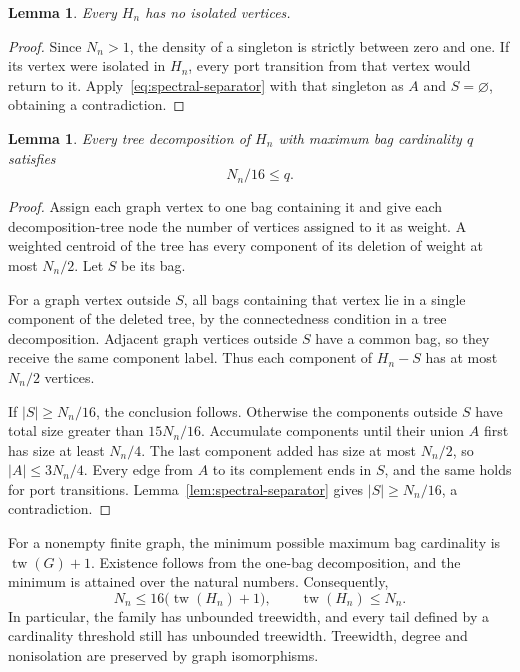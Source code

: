 \documentclass[11pt,reqno]{amsart}
\numberwithin{equation}{section}
\newtheorem{lemma}[theorem]{Lemma}
\theoremstyle{definition}
\theoremstyle{remark}
\newcommand{\tw}{\operatorname{tw}}
\begin{document}
\begin{lemma}\label{lem:no-isolates}
Every $H_n$ has no isolated vertices.
\end{lemma}
\begin{proof}
Since $N_n>1$, the density of a singleton is strictly between zero and one. If its vertex were isolated in $H_n$, every port transition from that vertex would return to it. Apply~\eqref{eq:spectral-separator} with that singleton as $A$ and $S=\varnothing$, obtaining a contradiction.
\end{proof}

\begin{lemma}\label{lem:bag}
Every tree decomposition of $H_n$ with maximum bag cardinality $q$ satisfies
\begin{equation}\label{eq:bag}
 N_n/16\le q.
\end{equation}
\end{lemma}
\begin{proof}
Assign each graph vertex to one bag containing it and give each decomposition-tree node the number of vertices assigned to it as weight. A weighted centroid of the tree has every component of its deletion of weight at most $N_n/2$. Let $S$ be its bag.

For a graph vertex outside $S$, all bags containing that vertex lie in a single component of the deleted tree, by the connectedness condition in a tree decomposition. Adjacent graph vertices outside $S$ have a common bag, so they receive the same component label. Thus each component of $H_n-S$ has at most $N_n/2$ vertices.

If $|S|\ge N_n/16$, the conclusion follows. Otherwise the components outside $S$ have total size greater than $15N_n/16$. Accumulate components until their union $A$ first has size at least $N_n/4$. The last component added has size at most $N_n/2$, so $|A|\le3N_n/4$. Every edge from $A$ to its complement ends in $S$, and the same holds for port transitions. Lemma~\ref{lem:spectral-separator} gives $|S|\ge N_n/16$, a contradiction.
\end{proof}

For a nonempty finite graph, the minimum possible maximum bag cardinality is $\tw(G)+1$. Existence follows from the one-bag decomposition, and the minimum is attained over the natural numbers. Consequently,
\begin{equation}\label{eq:width-family}
 N_n\le16\bigl(\tw(H_n)+1\bigr),
 \qquad \tw(H_n)\le N_n.
\end{equation}
In particular, the family has unbounded treewidth, and every tail defined by a cardinality threshold still has unbounded treewidth. Treewidth, degree and nonisolation are preserved by graph isomorphisms.
\end{document}
